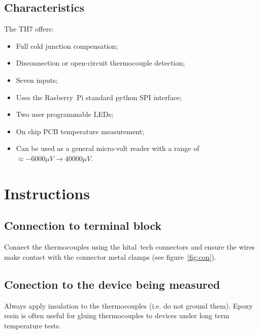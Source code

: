 \documentclass[10pt,foldmark]{leaflet}
\begin{document}
\subsection{Characteristics}
The TH7 offers:
\begin{itemize}
 \item Full cold junction compensation;
 \item Disconnection or open-circuit thermocouple detection;
 \item Seven inputs;
 \item Uses the Rasberry~Pi standard python SPI interface;
 \item Two user programmable LEDs;
 \item On chip PCB temperature measurement;
  \item Can be used as a general micro-volt reader with a range of $\approx -6000 \mu V \rightarrow 40000 \mu V$.
\end{itemize} 

\section{Instructions}
\subsection{Connection to terminal block}
%
Connect the thermocouples using the hital~tech connectors and ensure the wires make contact with the 
connector metal clamps (see figure~\ref{fig:con}).
%
\subsection{Conection to the device being measured}
%
Always apply insulation to the thermocouples (i.e. do not ground them).
%
Epoxy resin is often useful for gluing thermocouples to devices under long term temperature tests.
\end{document}

